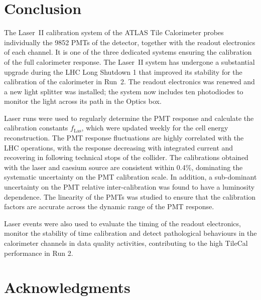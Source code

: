 \documentclass[a4paper,11pt]{article}
\begin{document}
\FloatBarrier


\section{Conclusion}
\label{sec:conclusion}

The Laser~II calibration system of the ATLAS Tile Calorimeter probes individually the 9852 PMTs of the detector, together with the readout electronics of each channel. It is one of the three dedicated systems ensuring the calibration of the full calorimeter response. The Laser~II system has undergone a substantial upgrade during the LHC Long Shutdown 1 that improved its stability for the calibration of the calorimeter in Run~2. The readout electronics was renewed and a new light splitter was installed; the system now includes ten photodiodes to monitor the light across its path in the Optics box.

Laser runs were used to regularly determine the PMT response and calculate the calibration constants $f_\mathrm{Las}$, which were updated weekly for the cell energy reconstruction. The PMT response fluctuations are highly correlated with the LHC operations, with the response decreasing with integrated current and recovering in following technical stops of the collider. The calibrations obtained with the laser and caesium source are consistent within 0.4\%, dominating the systematic uncertainty on the PMT calibration scale. In addition, a sub-dominant uncertainty on the PMT relative inter-calibration was found to have a luminosity dependence. The linearity of the PMTs was studied to ensure that the calibration factors are accurate across the dynamic range of the PMT response.%

Laser events were also used to evaluate the timing of the readout electronics, monitor the stability of time calibration and detect pathological behaviours in the calorimeter channels in data quality activities, contributing to the high TileCal performance in Run 2.

\section*{Acknowledgments}
\end{document}
